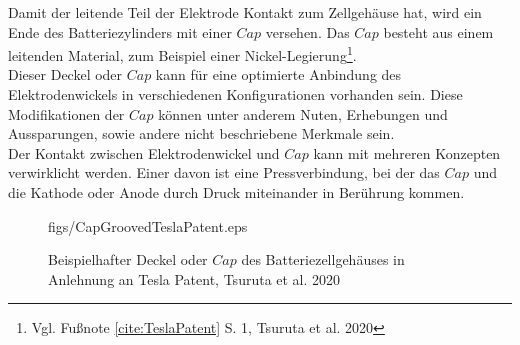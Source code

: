 Damit der leitende Teil der Elektrode Kontakt zum Zellgehäuse hat, wird ein Ende des Batteriezylinders mit einer $Cap$ versehen. Das $Cap$ besteht aus einem leitenden Material, zum Beispiel einer Nickel-Legierung\footnote{Vgl. Fußnote \ref{cite:TeslaPatent} S. 1, Tsuruta et al. 2020}.\\
Dieser Deckel oder $Cap$ kann für eine optimierte Anbindung des Elektrodenwickels in verschiedenen Konfigurationen vorhanden sein. Diese Modifikationen der $Cap$ können unter anderem Nuten, Erhebungen und Aussparungen, sowie andere nicht beschriebene Merkmale sein.\\
Der Kontakt zwischen Elektrodenwickel und $Cap$ kann mit mehreren Konzepten verwirklicht werden. Einer davon ist eine Pressverbindung, bei der das $Cap$ und die Kathode oder Anode durch Druck miteinander in Berührung kommen.\\

\begin{figure}[H]
	\begin{center}
		\begin{overpic}[width=14 cm]{figs/CapGroovedTeslaPatent.eps}
			
		\end{overpic}
	\end{center}
	
	
	\caption[Blah]{Beispielhafter Deckel oder \textbf{$Cap$} des Batteriezellgehäuses in Anlehnung an Tesla Patent, Tsuruta et al. 2020}
	
	\label{fig:CapGrooved}
\end{figure}



















 
